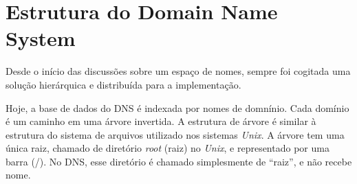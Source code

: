 \chapter{Estrutura do Domain Name System}

Desde o início das discussões sobre um espaço de nomes, sempre foi
cogitada uma solução hierárquica e distribuída  para a
implementação.

Hoje, a base de dados do DNS é indexada por nomes de domnínio. Cada
domínio é um caminho em uma árvore invertida. A estrutura de árvore é
similar à estrutura do sistema de arquivos utilizado nos sistemas
\textit{Unix}. A árvore tem uma única raiz, chamado de diretório
\textit{root} (raiz) no \textit{Unix}, e representado por uma barra
(/). No DNS, esse diretório é chamado simplesmente de ``raiz'', e não
recebe nome.
